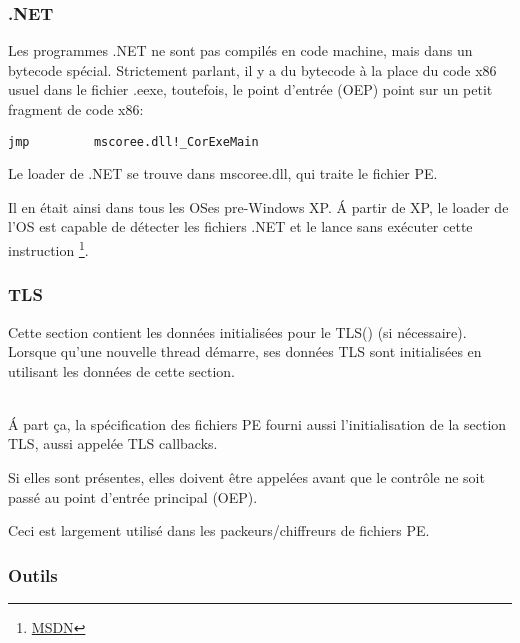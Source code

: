 \subsubsection{.NET}


Les programmes .NET ne sont pas compilés en code machine, mais dans un bytecode spécial.
Strictement parlant, il y a du bytecode à la place du code x86 usuel dans le fichier
.eexe, toutefois, le point d'entrée (\ac{OEP}) point sur un petit fragment de code
x86:

\begin{lstlisting}
jmp         mscoree.dll!_CorExeMain
\end{lstlisting}

Le loader de .NET se trouve dans mscoree.dll, qui traite le fichier PE.

Il en était ainsi dans tous les \ac{OS}es pre-Windows XP. Á partir de XP, le loader
de l'\ac{OS} est capable de détecter les fichiers .NET et le lance sans exécuter
cette instruction \JMP
\footnote{\href{http://go.yurichev.com/17051}{MSDN}}.

\subsubsection{TLS}

Cette section contient les données initialisées pour le \ac{TLS}() (si
nécessaire). Lorsque qu'une nouvelle thread démarre, ses données \ac{TLS} sont initialisées
en utilisant les données de cette section. \\
\\

Á part ça, la spécification des fichiers PE fourni aussi l'initialisation de la section
\ac{TLS}, aussi appelée TLS callbacks.

Si elles sont présentes, elles doivent être appelées avant que le contrôle ne soit
passé au point d'entrée principal (\ac{OEP}).

Ceci est largement utilisé dans les packeurs/chiffreurs de fichiers PE.

\subsubsection{Outils}

\label{ResHack}

